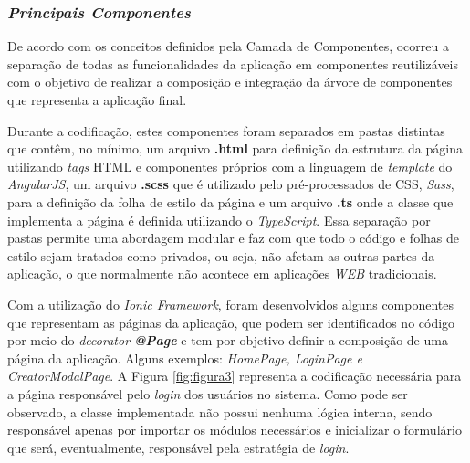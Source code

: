 \subsubsection{{\it Principais Componentes}}
De acordo com os conceitos definidos pela Camada de Componentes, ocorreu a separação de todas as funcionalidades da aplicação em componentes reutilizáveis com o objetivo de realizar a composição e integração da árvore de componentes que representa a aplicação final.

Durante a codificação, estes componentes foram separados em pastas distintas que contêm, no mínimo, um arquivo \textbf{.html} para definição da estrutura da página utilizando \textit{tags} HTML e componentes próprios com a linguagem de \textit{template} do \textit{AngularJS}, um arquivo \textbf{.scss} que é utilizado pelo pré-processados de CSS, \textit{Sass}, para a definição da folha de estilo da página e um arquivo \textbf{.ts} onde a classe que implementa a página é definida utilizando o \textit{TypeScript}. Essa separação por pastas permite uma abordagem modular e faz com que todo o código e folhas de estilo sejam tratados como privados, ou seja, não afetam as outras partes da aplicação, o que normalmente não acontece em aplicações \textit{WEB} tradicionais.

Com a utilização do\textit{ Ionic Framework}, foram desenvolvidos alguns componentes que representam as páginas da aplicação, que podem ser identificados no código por meio do \textit{decorator \textbf{@Page}} e tem por objetivo definir a composição de uma página da aplicação. Alguns exemplos: \textit{HomePage, LoginPage e CreatorModalPage}. A Figura \ref{fig:figura3} representa a codificação necessária para a página responsável pelo \textit{login} dos usuários no sistema. Como pode ser observado, a classe implementada não possui nenhuma lógica interna, sendo responsável apenas por importar os módulos necessários e inicializar o formulário que será, eventualmente, responsável pela estratégia de \textit{login}.

